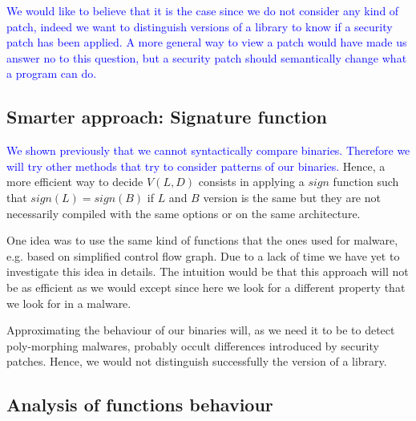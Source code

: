 \documentclass{article}
\newcommand{\ludo}[1]{\textcolor{blue}{#1}}
\newcommand{\signature}{{sign}}
\begin{document}
    \ludo{We would like to believe that it is the case since we do not
    consider any kind of patch, indeed we want to distinguish versions of a
    library to know if a security patch has been applied. A more general way
    to view a patch would have made us answer no to this question, but a
    security patch should semantically change what a program can do.}

    \subsection{Smarter approach: Signature function}\label{approach-sign}

    \ludo{We shown previously that we cannot syntactically compare binaries.
    Therefore we will try other methods that try to consider patterns of our
    binaries.} Hence, a more efficient way to decide $V(L,D)$ consists in
    applying a $\signature$ function such that $\signature(L) = \signature(B)$
    if $L$ and $B$ version is the same but they are not necessarily
    compiled with the same options or on the same architecture.
	
    One idea was to use the same kind of functions that the ones used for malware, e.g.
    based on simplified control flow graph. Due to a lack of time we have yet 
    to investigate this idea in details. The intuition would be that this
    approach will not be as efficient as we would except since here we look
    for a different property that we look for in a malware. 
    
    Approximating the behaviour of our binaries will, as we need it to be to
    detect poly-morphing malwares, probably occult differences introduced by
    security patches. Hence, we would not distinguish successfully the version
    of a library.
	
	\subsection{Analysis of functions behaviour}
	

 
\end{document}
